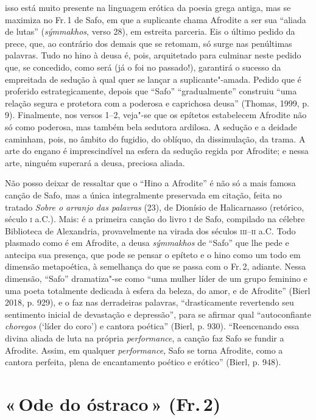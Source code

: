 {isso está muito presente na linguagem erótica da poesia grega antiga, mas se
maximiza no Fr.\,1 de Safo, em que a suplicante chama Afrodite a ser sua
“aliada de lutas” (\textit{sýmmakhos}, verso 28), em estreita parceria. Eis o último pedido da prece, que, ao contrário dos demais que se retomam, só surge nas penúltimas palavras. Tudo no hino à deusa é, pois, arquitetado para culminar neste pedido que, se concedido, como será (já o foi no passado!), garantirá o sucesso da empreitada de sedução à qual quer se lançar a suplicante"-amada. Pedido que é proferido estrategicamente, depois que ``Safo'' ``gradualmente'' construiu ``uma relação segura e protetora com a poderosa e caprichosa deusa'' (Thomas, 1999, p.\,9). Finalmente, nos versos 1--2, veja"-se
que os epítetos estabelecem Afrodite não só como poderosa, mas também bela
sedutora ardilosa. A sedução e a deidade caminham, pois, no âmbito do fugidio,
do oblíquo, da dissimulação, da trama. A arte do engano é imprescindível na
esfera da sedução regida por Afrodite; e nessa arte, ninguém superará a deusa,
preciosa aliada.

Não posso deixar de ressaltar que o “Hino a Afrodite” é não só
a mais famosa canção de Safo, mas a única integralmente preservada em citação, feita no tratado \textit{Sobre o arranjo das palavras} (23), de Dionísio de Halicarnasso (retórico, século \textsc{i} a.C.). Mais: é a primeira canção do livro \textsc{i} de Safo,
compilado na célebre Biblioteca de Alexandria, provavelmente na virada dos
séculos \textsc{iii}--\textsc{ii} a.C.
Todo plasmado como é em Afrodite, a deusa \textit{sýmmakhos} de ``Safo'' que lhe pede e antecipa sua presença, que pode se pensar o epíteto e o hino como um todo em dimensão metapoética, à semelhança do que se passa com o Fr.\,2, adiante. Nessa dimensão, ``Safo'' dramatiza"-se como ``uma mulher líder de um grupo feminino e uma poeta totalmente dedicada à esfera da beleza, do amor, e de Afrodite'' (Bierl 2018, p. 929), e o faz nas derradeiras palavras, “drasticamente revertendo seu sentimento inicial de devastação e depressão”, para se afirmar qual “autoconfiante \textit{choregos} (‘líder do coro’) e cantora poética” (Bierl, p. 930). “Reencenando essa divina aliada de luta na própria \textit{performance}, a canção faz Safo se fundir a Afrodite. Assim, em qualquer \textit{performance}, Safo se torna Afrodite, como a cantora perfeita, plena de encantamento poético e erótico” (Bierl, p. 948).}

\pagebreak
\section{«\,Ode do óstraco\,» (Fr.\,2)}

